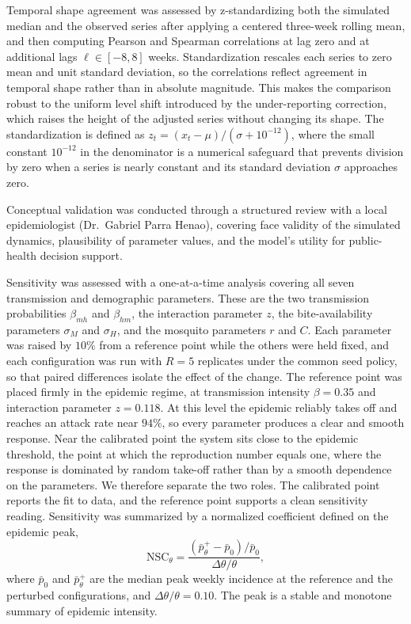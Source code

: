 \documentclass[applsci,article,accept,pdftex,moreauthors]{Definitions/mdpi}
\begin{document}
Temporal shape agreement was assessed by z-standardizing both the simulated median and the observed series after applying a centered three-week rolling mean, and then computing Pearson and Spearman correlations at lag zero and at additional lags $\ell \in [-8, 8]$ weeks. Standardization rescales each series to zero mean and unit standard deviation, so the correlations reflect agreement in temporal shape rather than in absolute magnitude. This makes the comparison robust to the uniform level shift introduced by the under-reporting correction, which raises the height of the adjusted series without changing its shape. The standardization is defined as $z_t = (x_t - \mu)/(\sigma + 10^{-12})$, where the small constant $10^{-12}$ in the denominator is a numerical safeguard that prevents division by zero when a series is nearly constant and its standard deviation $\sigma$ approaches zero.

Conceptual validation was conducted through a structured review with a local epidemiologist (Dr.~Gabriel Parra Henao), covering face validity of the simulated dynamics, plausibility of parameter values, and the model's utility for public-health decision support.

Sensitivity was assessed with a one-at-a-time analysis covering all seven transmission and demographic parameters. These are the two transmission probabilities $\beta_{mh}$ and $\beta_{hm}$, the interaction parameter $z$, the bite-availability parameters $\sigma_M$ and $\sigma_H$, and the mosquito parameters $r$ and $C$. Each parameter was raised by $10\%$ from a reference point while the others were held fixed, and each configuration was run with $R=5$ replicates under the common seed policy, so that paired differences isolate the effect of the change. The reference point was placed firmly in the epidemic regime, at transmission intensity $\beta=0.35$ and interaction parameter $z=0.118$. At this level the epidemic reliably takes off and reaches an attack rate near $94\%$, so every parameter produces a clear and smooth response. Near the calibrated point the system sits close to the epidemic threshold, the point at which the reproduction number equals one, where the response is dominated by random take-off rather than by a smooth dependence on the parameters. We therefore separate the two roles. The calibrated point reports the fit to data, and the reference point supports a clean sensitivity reading. Sensitivity was summarized by a normalized coefficient defined on the epidemic peak,
\begin{equation}
\mathrm{NSC}_\theta = \frac{(\bar p_{\theta}^{+} - \bar p_{0})/\bar p_{0}}{\Delta\theta/\theta},
\label{eq:nsc_peak}
\end{equation}
where $\bar p_0$ and $\bar p_\theta^{+}$ are the median peak weekly incidence at the reference and the perturbed configurations, and $\Delta\theta/\theta = 0.10$. The peak is a stable and monotone summary of epidemic intensity.
\end{document}

